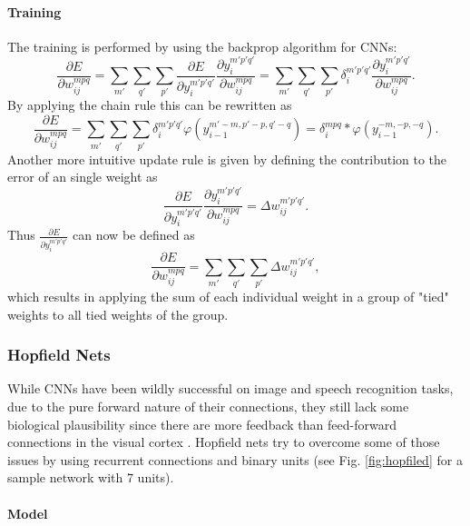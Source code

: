 \paragraph{Training} \label{c:cnntraining}


The training is performed by using the backprop algorithm for CNNs:
\[
\frac{\partial E}{\partial w_{ij}^{mpq}} = \sum_{m'} \sum_ {q'}  \sum_{p'} \frac{\partial E}{\partial y_i^{m' p' q'}}  \frac{\partial y_i^{m' p' q'}}{\partial w_{ij}^{mpq}}  = \sum_{m'} \sum_ {q'}  \sum_{p'} \delta_i^{m' p' q'}  \frac{\partial y_i^{m' p' q'}}{\partial w_{ij}^{mpq}}.
\] 
By applying the chain rule this can be rewritten as
\[
\frac{\partial E}{\partial w_{ij}^{mpq}} = \sum_{m'} \sum_ {q'}  \sum_{p'} \delta_i^{m' p' q'}  \varphi(y_{i-1}^{m'-m, p'-p, q'-q}) = \delta_i^{m p q}  * \varphi(y_{i-1}^{-m, -p, -q}).
\] 
Another more intuitive update rule is given by defining the contribution to the error of an single weight as
\[
\frac{\partial E}{\partial y_i^{m' p' q'}}  \frac{\partial y_i^{m' p' q'}}{\partial w_{ij}^{mpq}}  = \Delta w_{ij}^{m' p' q'}.
\] 
Thus $\frac{\partial E}{\partial y_i^{m' p' q'}}$ can now be defined as
\[
\frac{\partial E}{\partial w_{ij}^{mpq}} = \sum_{m'} \sum_ {q'}  \sum_{p'} \Delta w_{ij}^{m' p' q'},
\] 
which results in applying the sum of each individual weight in a group of "tied" weights to all tied weights of the group.



\subsubsection{Hopfield Nets} \label{c:hopnets}

While CNNs have been wildly successful on image and speech recognition tasks, due to the pure forward nature of their connections, they still lack some biological plausibility since there are more feedback than feed-forward connections in the visual cortex \cite{sillito2006always}.
Hopfield nets try to overcome some of those issues by using recurrent connections and binary units \cite{hopfield1982neural} \cite{Goodfellow-et-al-2016-Book} (see Fig. \ref{fig:hopfiled} for a sample network with 7 units).

\paragraph{Model} \label{c:hopmodel}

